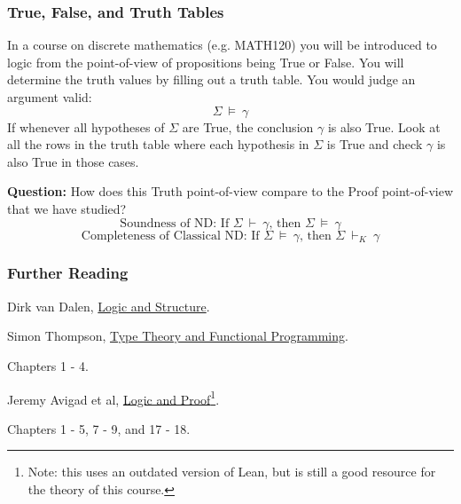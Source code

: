 \documentclass{beamer}
\begin{document}
\begin{frame}
	\frametitle{True, False, and Truth Tables}
	
	In a course on discrete mathematics (e.g. MATH120) you will be introduced to logic from the point-of-view of propositions being True or False. You will determine the truth values by filling out a truth table. You would judge an argument valid:	
	$$\Sigma \ \vDash \ \gamma$$	
	If whenever all hypotheses of $\Sigma$ are True, the conclusion $\gamma$ is also True. Look at all the rows in the truth table where each hypothesis in $\Sigma$ is True and check $\gamma$ is also True in those cases. 
	
	\textbf{Question:} How does this Truth point-of-view compare to the Proof point-of-view that we have studied?	
	$$\text{Soundness of ND: If } \Sigma \ \vdash \ \gamma \text{, then } \Sigma \ \vDash \ \gamma$$	
	$$\text{Completeness of Classical ND: If } \Sigma \ \vDash \ \gamma \text{, then } \Sigma \ \vdash_{K} \ \gamma$$

\end{frame}

\begin{frame}
	\frametitle{Further Reading}

	Dirk van Dalen, \href{https://libcat.canterbury.ac.nz/Record/112862}{Logic and Structure}. 

	\vspace{10mm}

	Simon Thompson, \href{https://www.cs.cornell.edu/courses/cs6110/2015sp/textbook/Simon\%20Thompson\%20textbook.pdf}{Type Theory and Functional Programming}. 
	
	Chapters 1 - 4. 

	\vspace{10mm}

	Jeremy Avigad et al, \href{https://leanprover.github.io/logic_and_proof_lean3/index.html}{Logic and Proof}\footnote{Note: this uses an outdated version of Lean, but is still a good resource for the theory of this course.}. 
	
	Chapters 1 - 5, 7 - 9, and 17 - 18.
\end{frame}
\end{document}
